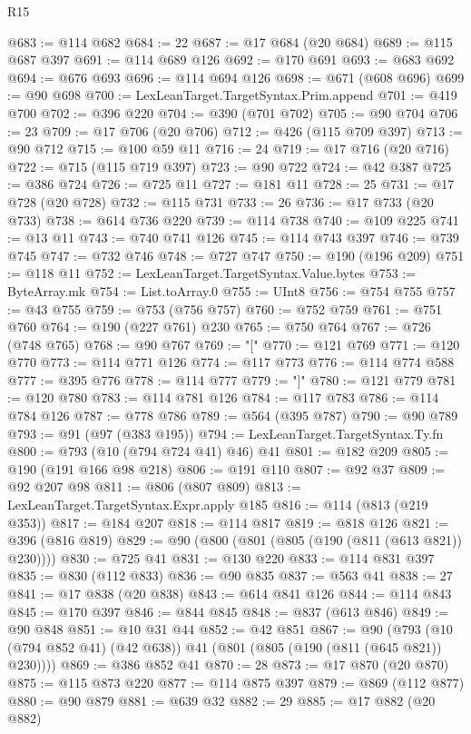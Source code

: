 \begin{lexlean}{R15}
\begin{coremodule}
@683 := @114 @682
@684 := 22
@687 := @17 @684 (@20 @684)
@689 := @115 @687 @397
@691 := @114 @689 @126
@692 := @170 @691
@693 := @683 @692
@694 := @676 @693
@696 := @114 @694 @126
@698 := @671 (@608 @696)
@699 := @90 @698
@700 := LexLeanTarget.TargetSyntax.Prim.append
@701 := @419 @700
@702 := @396 @220
@704 := @390 (@701 @702)
@705 := @90 @704
@706 := 23
@709 := @17 @706 (@20 @706)
@712 := @426 (@115 @709 @397)
@713 := @90 @712
@715 := @100 @59 @11
@716 := 24
@719 := @17 @716 (@20 @716)
@722 := @715 (@115 @719 @397)
@723 := @90 @722
@724 := @42 @387
@725 := @386 @724
@726 := @725 @11
@727 := @181 @11
@728 := 25
@731 := @17 @728 (@20 @728)
@732 := @115 @731
@733 := 26
@736 := @17 @733 (@20 @733)
@738 := @614 @736 @220
@739 := @114 @738
@740 := @109 @225
@741 := @13 @11
@743 := @740 @741 @126
@745 := @114 @743 @397
@746 := @739 @745
@747 := @732 @746
@748 := @727 @747
@750 := @190 (@196 @209)
@751 := @118 @11
@752 := LexLeanTarget.TargetSyntax.Value.bytes
@753 := ByteArray.mk
@754 := List.toArray.{0}
@755 := UInt8
@756 := @754 @755
@757 := @43 @755
@759 := @753 (@756 @757)
@760 := @752 @759
@761 := @751 @760
@764 := @190 (@227 @761) @230
@765 := @750 @764
@767 := @726 (@748 @765)
@768 := @90 @767
@769 := "["
@770 := @121 @769
@771 := @120 @770
@773 := @114 @771 @126
@774 := @117 @773
@776 := @114 @774 @588
@777 := @395 @776
@778 := @114 @777
@779 := "]"
@780 := @121 @779
@781 := @120 @780
@783 := @114 @781 @126
@784 := @117 @783
@786 := @114 @784 @126
@787 := @778 @786
@789 := @564 (@395 @787)
@790 := @90 @789
@793 := @91 (@97 (@383 @195))
@794 := LexLeanTarget.TargetSyntax.Ty.fn
@800 := @793 (@10 (@794 @724 @41) @46) @41
@801 := @182 @209
@805 := @190 (@191 @166 @98 @218)
@806 := @191 @110
@807 := @92 @37
@809 := @92 @207 @98
@811 := @806 (@807 @809)
@813 := LexLeanTarget.TargetSyntax.Expr.apply @185
@816 := @114 (@813 (@219 @353))
@817 := @184 @207
@818 := @114 @817
@819 := @818 @126
@821 := @396 (@816 @819)
@829 := @90 (@800 (@801 (@805 (@190 (@811 (@613 @821)) @230))))
@830 := @725 @41
@831 := @130 @220
@833 := @114 @831 @397
@835 := @830 (@112 @833)
@836 := @90 @835
@837 := @563 @41
@838 := 27
@841 := @17 @838 (@20 @838)
@843 := @614 @841 @126
@844 := @114 @843
@845 := @170 @397
@846 := @844 @845
@848 := @837 (@613 @846)
@849 := @90 @848
@851 := @10 @31 @44
@852 := @42 @851
@867 := @90 (@793 (@10 (@794 @852 @41) (@42 @638)) @41 (@801 (@805 (@190 (@811 (@645 @821)) @230))))
@869 := @386 @852 @41
@870 := 28
@873 := @17 @870 (@20 @870)
@875 := @115 @873 @220
@877 := @114 @875 @397
@879 := @869 (@112 @877)
@880 := @90 @879
@881 := @639 @32
@882 := 29
@885 := @17 @882 (@20 @882)

\end{coremodule}
\end{lexlean}
